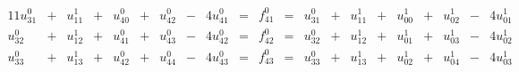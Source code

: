 \begin{alignat*}{11}
u_{31}^0 & {}+{} & u_{11}^1 & {}+{} & u_{40}^0 & {}+{} &  u_{42}^0 & {}-{} &  4u_{41}^0 & {}={} & f_{41}^0 & {}={} & u_{31}^0 & {}+{} & u_{11}^1 & {}+{} & u_{00}^1 & {}+{} &  u_{02}^1 & {}-{} &  4u_{01}^1 \\
u_{32}^0 & {}+{} & u_{12}^1 & {}+{} & u_{41}^0 & {}+{} &  u_{43}^0 & {}-{} &  4u_{42}^0 & {}={} & f_{42}^0 & {}={} & u_{32}^0 & {}+{} & u_{12}^1 & {}+{} & u_{01}^1 & {}+{} &  u_{03}^1 & {}-{} &  4u_{02}^1 \\
u_{33}^0 & {}+{} & u_{13}^1 & {}+{} & u_{42}^0 & {}+{} &  u_{44}^0 & {}-{} &  4u_{43}^0 & {}={} & f_{43}^0 & {}={} & u_{33}^0 & {}+{} & u_{13}^1 & {}+{} & u_{02}^1 & {}+{} &  u_{04}^1 & {}-{} &  4u_{03}^1
\end{alignat*}